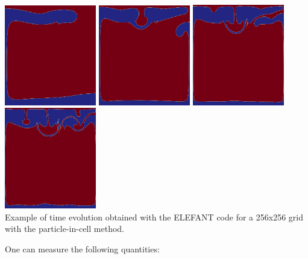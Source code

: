 \begin{center}
\includegraphics[width=4cm]{images/benchmark_vaks97/elefant256_0500.png}
\includegraphics[width=4cm]{images/benchmark_vaks97/elefant256_1000.png}
\includegraphics[width=4cm]{images/benchmark_vaks97/elefant256_1500.png}
\includegraphics[width=4cm]{images/benchmark_vaks97/elefant256_2000.png}\\
{\captionfont Example of time evolution obtained with the ELEFANT code for 
a 256x256 grid with the particle-in-cell method.}
\end{center}

One can measure the following quantities:

